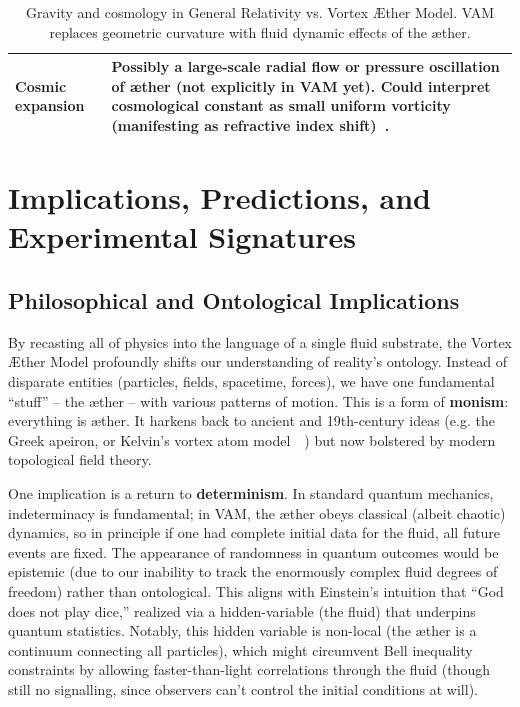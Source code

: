 \documentclass[a4paper,12pt]{article}
\begin{document}
\begin{table}[H]
\begin{tabular}{p{} | p{}}
            Cosmic expansion & Possibly a large-scale radial flow or pressure oscillation of æther (not explicitly in VAM yet). Could interpret cosmological constant as small uniform vorticity (manifesting as refractive index shift)~\cite{reference_231}. \\
            \hline
        \end{tabular}
        \caption{Gravity and cosmology in General Relativity vs. Vortex Æther Model.  VAM replaces geometric curvature with fluid dynamic effects of the æther.}
        \label{tab:GRcompare}
    \end{table}

    \newpage

\section{Implications, Predictions, and Experimental Signatures}
    \subsection{Philosophical and Ontological Implications}
    By recasting all of physics into the language of a single fluid substrate, the Vortex Æther Model profoundly shifts our understanding of reality's ontology. Instead of disparate entities (particles, fields, spacetime, forces), we have one fundamental “stuff” -- the æther -- with various patterns of motion. This is a form of \textbf{monism}: everything is æther. It harkens back to ancient and 19th-century ideas (e.g. the Greek apeiron, or Kelvin’s vortex atom model~\cite{reference_232}~\cite{reference_233}) but now bolstered by modern topological field theory.

    One implication is a return to \textbf{determinism}. In standard quantum mechanics, indeterminacy is fundamental; in VAM, the æther obeys classical (albeit chaotic) dynamics, so in principle if one had complete initial data for the fluid, all future events are fixed. The appearance of randomness in quantum outcomes would be epistemic (due to our inability to track the enormously complex fluid degrees of freedom) rather than ontological. This aligns with Einstein’s intuition that “God does not play dice,” realized via a hidden-variable (the fluid) that underpins quantum statistics. Notably, this hidden variable is non-local (the æther is a continuum connecting all particles), which might circumvent Bell inequality constraints by allowing faster-than-light correlations through the fluid (though still no signalling, since observers can’t control the initial conditions at will).
\end{document}
